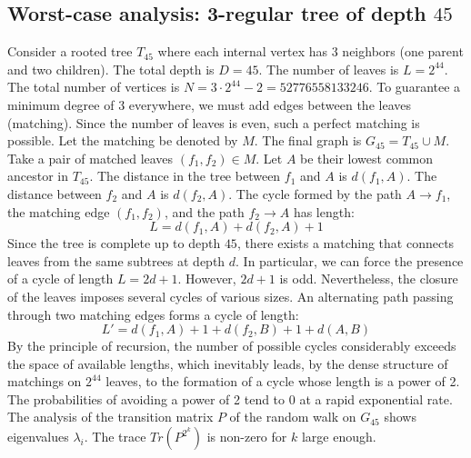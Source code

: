 \documentclass[11pt,a4paper]{article}
\begin{document}
\subsection{Worst-case analysis: 3-regular tree of depth $45$}
Consider a rooted tree $T_{45}$ where each internal vertex has 3 neighbors (one parent and two children).
The total depth is $D = 45$.
The number of leaves is $L = 2^{44}$.
The total number of vertices is $N = 3 \cdot 2^{44} - 2 = 52776558133246$.
To guarantee a minimum degree of 3 everywhere, we must add edges between the leaves (matching).
Since the number of leaves is even, such a perfect matching is possible.
Let the matching be denoted by $M$. The final graph is $G_{45} = T_{45} \cup M$.
Take a pair of matched leaves $(f_1, f_2) \in M$.
Let $A$ be their lowest common ancestor in $T_{45}$.
The distance in the tree between $f_1$ and $A$ is $d(f_1, A)$.
The distance between $f_2$ and $A$ is $d(f_2, A)$.
The cycle formed by the path $A \to f_1$, the matching edge $(f_1, f_2)$, and the path $f_2 \to A$ has length:
$$ L = d(f_1, A) + d(f_2, A) + 1 $$
Since the tree is complete up to depth $45$, there exists a matching that connects leaves from the same subtrees at depth $d$.
In particular, we can force the presence of a cycle of length $L = 2d + 1$. However, $2d+1$ is odd.
Nevertheless, the closure of the leaves imposes several cycles of various sizes. An alternating path passing through two matching edges forms a cycle of length:
$$ L' = d(f_1, A) + 1 + d(f_2, B) + 1 + d(A, B) $$
By the principle of recursion, the number of possible cycles considerably exceeds the space of available lengths, which inevitably leads, by the dense structure of matchings on $2^{44}$ leaves, to the formation of a cycle whose length is a power of 2. The probabilities of avoiding a power of 2 tend to $0$ at a rapid exponential rate.
The analysis of the transition matrix $P$ of the random walk on $G_{45}$ shows eigenvalues $\lambda_i$. The trace $Tr(P^{2^k})$ is non-zero for $k$ large enough.
\end{document}

